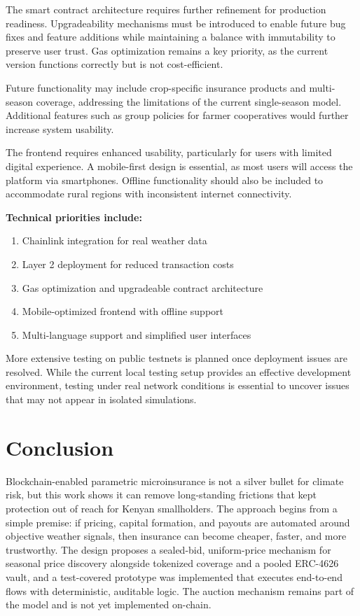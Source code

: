 \documentclass[11pt,a4paper]{article}
\begin{document}
		The smart contract architecture requires further refinement for production readiness. 
		Upgradeability mechanisms must be introduced to enable future bug fixes and feature additions while maintaining a balance with immutability to preserve user trust. 
		Gas optimization remains a key priority, as the current version functions correctly but is not cost-efficient. 

		Future functionality may include crop-specific insurance products and multi-season coverage, addressing the limitations of the current single-season model. 
		Additional features such as group policies for farmer cooperatives would further increase system usability. 

		The frontend requires enhanced usability, particularly for users with limited digital experience. 
		A mobile-first design is essential, as most users will access the platform via smartphones. 
		Offline functionality should also be included to accommodate rural regions with inconsistent internet connectivity. 

		\textbf{Technical priorities include:}

		\begin{enumerate}
			\item Chainlink integration for real weather data
			\item Layer 2 deployment for reduced transaction costs
			\item Gas optimization and upgradeable contract architecture
			\item Mobile-optimized frontend with offline support
			\item Multi-language support and simplified user interfaces
		\end{enumerate}

		More extensive testing on public testnets is planned once deployment issues are resolved. 
		While the current local testing setup provides an effective development environment, testing under real network conditions is essential to uncover issues that may not appear in isolated simulations.

		\section{Conclusion}\label{sec:conclusion}
		Blockchain-enabled parametric microinsurance is not a silver bullet for climate risk, but this work shows it can remove long-standing frictions that kept protection out of reach for Kenyan smallholders.
        The approach begins from a simple premise: if pricing, capital formation, and payouts are automated around objective weather signals, then insurance can become cheaper, faster, and more trustworthy.
        The design proposes a sealed-bid, uniform-price mechanism for seasonal price discovery alongside tokenized coverage and a pooled ERC-4626 vault, and a test-covered prototype was implemented that executes end-to-end flows with deterministic, auditable logic. The auction mechanism remains part of the model and is not yet implemented on-chain.
\end{document}
